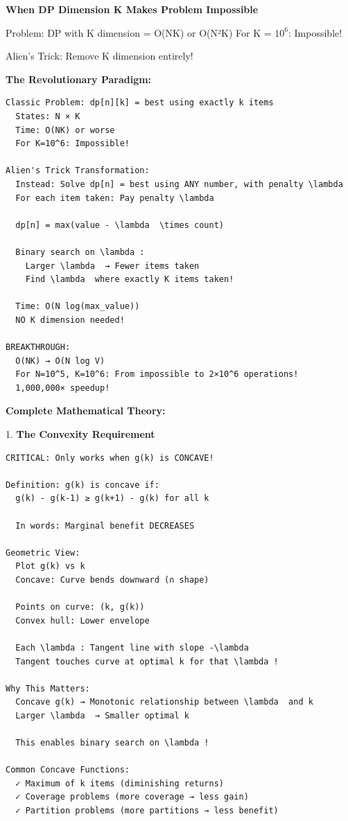 \documentclass[11pt,a4paper,oneside]{book}
\begin{document}
\begin{tcolorbox}[
    enhanced,breakable,
    colback=white,
    colframe=deepblue,
    boxrule=1.5pt,
    arc=3mm,
    title=\textbf{The Ultimate DP Optimization}
]
\textbf{When DP Dimension K Makes Problem Impossible}

Problem: DP with K dimension = O(NK) or O(N²K)
For K = $10^6$: Impossible!

Alien's Trick: Remove K dimension entirely!

\textbf{The Revolutionary Paradigm:}
\begin{verbatim}
Classic Problem: dp[n][k] = best using exactly k items
  States: N × K
  Time: O(NK) or worse
  For K=10^6: Impossible!

Alien's Trick Transformation:
  Instead: Solve dp[n] = best using ANY number, with penalty \lambda 
  For each item taken: Pay penalty \lambda 
  
  dp[n] = max(value - \lambda  \times count)
  
  Binary search on \lambda :
    Larger \lambda  → Fewer items taken
    Find \lambda  where exactly K items taken!
  
  Time: O(N log(max_value))
  NO K dimension needed!

BREAKTHROUGH:
  O(NK) → O(N log V)
  For N=10^5, K=10^6: From impossible to 2×10^6 operations!
  1,000,000× speedup!
\end{verbatim}

\textbf{Complete Mathematical Theory:}

1. \textbf{The Convexity Requirement}
\begin{verbatim}
CRITICAL: Only works when g(k) is CONCAVE!

Definition: g(k) is concave if:
  g(k) - g(k-1) ≥ g(k+1) - g(k) for all k
  
  In words: Marginal benefit DECREASES

Geometric View:
  Plot g(k) vs k
  Concave: Curve bends downward (∩ shape)
  
  Points on curve: (k, g(k))
  Convex hull: Lower envelope
  
  Each \lambda : Tangent line with slope -\lambda 
  Tangent touches curve at optimal k for that \lambda !

Why This Matters:
  Concave g(k) → Monotonic relationship between \lambda  and k
  Larger \lambda  → Smaller optimal k
  
  This enables binary search on \lambda !

Common Concave Functions:
  ✓ Maximum of k items (diminishing returns)
  ✓ Coverage problems (more coverage → less gain)
  ✓ Partition problems (more partitions → less benefit)
  

\end{verbatim}
\end{tcolorbox}
\end{document}
